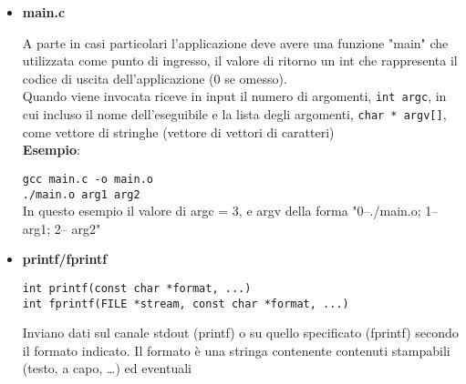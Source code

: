 \begin{flushleft}
\begin{itemize}
\begin{itemize}
{                          int valore = *(pointer) // ottiene un valore puntato}\\
                  \&: ottiene l'indirizzo di memoria in cui \ace collocata 
                  una certa variabile.\\    
                  \texttt{long whereIsValore = \&valore}              
            \item \textbf{Funzioni}: C consente anche di creare dei puntatori a delle 
                  funzioni: puntatori che possono contenere l'indirizzo di funzioni differenti\\
                  \texttt{float (*punt)(float,float)}\\
                  \texttt{ret\_type (*ptnName)(argType, argType,....)}
          \end{itemize}
    \item \textbf{main.c}\par 
          A parte in casi particolari l'applicazione deve avere una funzione "main" che 
          \ace utilizzata come punto di ingresso, il valore di ritorno \ace un int che rappresenta 
          il codice di uscita dell'applicazione (0 se omesso). \\
          Quando viene invocata riceve in input il numero di argomenti, \texttt{int argc}, in cui \ace incluso 
          il nome dell'eseguibile e la lista degli argomenti, \texttt{char * argv[]}, come vettore 
          di stringhe (vettore di vettori di caratteri)\\
          \textbf{Esempio}: 
          \begin{flushleft}
            \texttt{gcc main.c -o main.o \\
                    ./main.o arg1 arg2}\\
                    In questo esempio il valore di argc = 3, e argv \ace della 
                    forma "0--./main.o; 1-- arg1; 2-- arg2"
          \end{flushleft}
    \item \textbf{printf/fprintf} \\
          \begin{flushleft}
            \texttt{int printf(const char *format, ...)\\
            int fprintf(FILE *stream, const char *format, ...)}
          \end{flushleft}
          Inviano dati sul canale stdout (printf) o su quello specificato (fprintf) secondo il formato 
          indicato.
          Il formato è una stringa contenente contenuti stampabili (testo, a capo, …) ed eventuali 

\end{itemize}
\end{flushleft}
